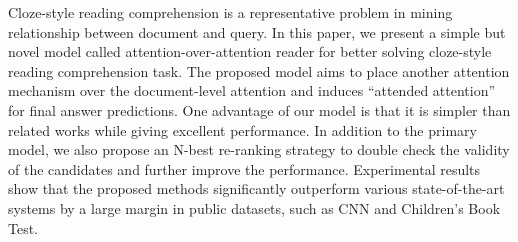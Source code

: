 Cloze-style reading comprehension is a representative problem in mining relationship between document and query. In this paper, we present a simple but novel model called attention-over-attention reader for better solving cloze-style reading comprehension task. The proposed model aims to place another attention mechanism over the document-level attention and induces ``attended attention'' for final answer predictions. One advantage of our model is that it is simpler than related works while giving excellent performance. In addition to the primary model, we also propose an N-best re-ranking strategy to double check the validity of the candidates and further improve the performance. Experimental results show that the proposed methods significantly outperform various state-of-the-art systems by a large margin in public datasets, such as CNN and Children's Book Test.
